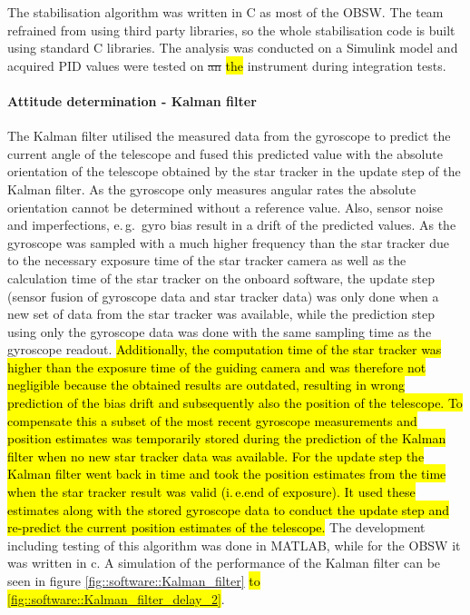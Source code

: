 The stabilisation algorithm was written in C as most of the OBSW. The team refrained from using third party libraries, so the whole stabilisation code is built using standard C libraries. The analysis was conducted on a Simulink model and acquired PID values were tested on \st{an} \hl{the} instrument during integration tests.

\paragraph{Attitude determination - Kalman filter}

The Kalman filter utilised the measured data from the gyroscope to predict the current angle of the telescope and fused this predicted value with the absolute orientation of the telescope obtained by the star tracker in the update step of the Kalman filter. As the gyroscope only measures angular rates the absolute orientation cannot be determined without a reference value. Also, sensor noise and imperfections, e.\,g.~gyro bias result in a drift of the predicted values. As the gyroscope was sampled with a much higher frequency than the star tracker due to the necessary exposure time of the star tracker camera as well as the calculation time of the star tracker on the onboard software, the update step (sensor fusion of gyroscope data and star tracker data) was only done when a new set of data from the star tracker was available, while the prediction step using only the gyroscope data was done with the same sampling time as the gyroscope readout. 
\hl{Additionally, the computation time of the star tracker was higher than the exposure time of the guiding camera and was therefore not negligible because the obtained results are outdated, resulting in wrong prediction of the bias drift and subsequently also the position of the telescope. To compensate this a subset of the most recent gyroscope measurements and position estimates was temporarily stored during the prediction of the Kalman filter when no new star tracker data was available. For the update step the Kalman filter went back in time and took the position estimates from the time when the star tracker result was valid (i.\,e.end of exposure). It used these estimates along with the stored gyroscope data to conduct the update step and re-predict the current position estimates of the telescope.}
 The development including testing of this algorithm was done in MATLAB, while for the OBSW it was written in c. A simulation of the performance of the Kalman filter can be seen in figure \mbox{\ref{fig::software::Kalman_filter}} \hl{to \mbox{\ref{fig::software::Kalman_filter_delay_2}}}. 
